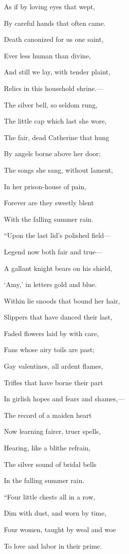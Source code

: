 As if by loving eyes that wept,

By careful hands that often came.

Death canonized for us one saint,

Ever less human than divine,

And still we lay, with tender plaint,

Relics in this household shrine.---

The silver bell, so seldom rung,

The little cap which last she wore,

The fair, dead Catherine that hung

By angels borne above her door;

The songs she sang, without lament,

In her prison-house of pain,

Forever are they sweetly blent

With the falling summer rain.

\hfill\break

``Upon the last lid's polished field---

Legend now both fair and true---

A gallant knight bears on his shield,

`Amy,' in letters gold and blue.

Within lie snoods that bound her hair,

Slippers that have danced their last,

Faded flowers laid by with care,

Fans whose airy toils are past;

Gay valentines, all ardent flames,

Trifles that have borne their part

In girlish hopes and fears and shames,---

The record of a maiden heart

Now learning fairer, truer spells,

Hearing, like a blithe refrain,

The silver sound of bridal bells

In the falling summer rain.

\hfill\break

``Four little chests all in a row,

Dim with dust, and worn by time,

Four women, taught by weal and woe

To love and labor in their prime.

